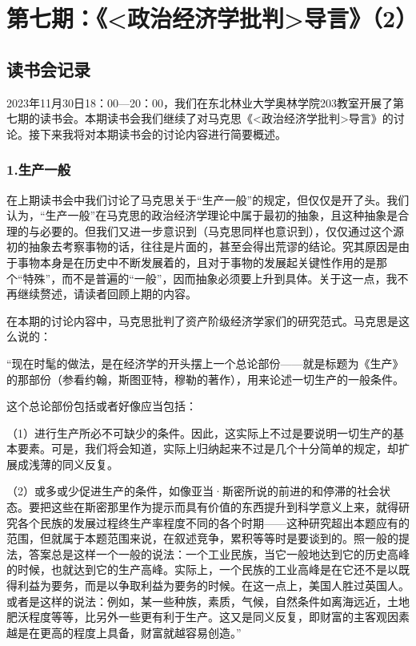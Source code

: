 \documentclass[a4paper,twoside,12pt,AutoFakeBold]{ctexart}
\begin{document}
\section{第七期：《<政治经济学批判>导言》（2）}
\subsection{读书会记录}
2023年11月30日18：00—20：00，我们在东北林业大学奥林学院203教室开展了第七期的读书会。本期读书会我们继续了对马克思《<政治经济学批判>导言》的讨论。接下来我将对本期读书会的讨论内容进行简要概述。
\subsubsection{1.生产一般}
在上期读书会中我们讨论了马克思关于“生产一般”的规定，但仅仅是开了头。我们认为，“生产一般”在马克思的政治经济学理论中属于最初的抽象，且这种抽象是合理的与必要的。但我们又进一步意识到（马克思同样也意识到），仅仅通过这个源初的抽象去考察事物的话，往往是片面的，甚至会得出荒谬的结论。究其原因是由于事物本身是在历史中不断发展着的，且对于事物的发展起关键性作用的是那个“特殊”，而不是普遍的“一般”，因而抽象必须要上升到具体。关于这一点，我不再继续赘述，请读者回顾上期的内容。

在本期的讨论内容中，马克思批判了资产阶级经济学家们的研究范式。马克思是这么说的：
\begin{adjustwidth}{2em}{2em}
    \qquad\fangsong
“现在时髦的做法，是在经济学的开头摆上一个总论部份——就是标题为《生产》的那部份（参看约翰，斯图亚特，穆勒的著作），用来论述一切生产的一般条件。
    
这个总论部份包括或者好像应当包括：

（1）进行生产所必不可缺少的条件。因此，这实际上不过是要说明一切生产的基本要素。可是，我们将会知道，实际上归纳起来不过是几个十分简单的规定，却扩展成浅薄的同义反复。

（2）或多或少促进生产的条件，如像亚当·斯密所说的前进的和停滞的社会状态。要把这些在斯密那里作为提示而具有价值的东西提升到科学意义上来，就得研究各个民族的发展过程终生产率程度不同的各个时期——这种研究超出本题应有的范围，但就属于本题范围来说，在叙述竞争，累积等等时是要谈到的。照一般的提法，答案总是这样一个一般的说法：一个工业民族，当它一般地达到它的历史高峰的时候，也就达到它的生产高峰。实际上，一个民族的工业高峰是在它还不是以既得利益为要务，而是以争取利益为要务的时候。在这一点上，美国人胜过英国人。或者是这样的说法：例如，某一些种族，素质，气候，自然条件如离海远近，土地肥沃程度等等，比另外一些更有利于生产。这又是同义反复，即财富的主客观因素越是在更高的程度上具备，财富就越容易创造。”
\end{adjustwidth}
\vspace{0.3cm}
\end{document}

